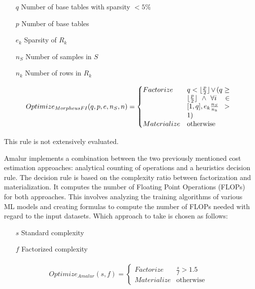 \begin{definition}
	\begin{itemize}
		\item[]
			\item[$q$]Number of base tables with sparsity $ < 5\% $
		\item[$p$] Number of base tables
		\item[$e_k$] Sparsity of $R_k$
		\item[$n_S$] Number of samples in $S$
		\item[$n_k$] Number of rows in $R_k$
	\end{itemize}

	\begin{align*}
		\begin{split}
			Optimize_{MorpheusFI}(q, p, e, n_S, n) =
			\begin{cases}
				Factorize   & \parbox[t]{.18\linewidth}{$q < \lfloor \frac{p}{2} \rfloor \vee ( q \geq \lfloor \frac{p}{2} \rfloor \wedge \forall i \in [1,q], e_k \frac{n_S}{n_k} > 1)$} \\
				Materialize & \text{otherwise}
			\end{cases}
		\end{split}
	\end{align*}
\end{definition}

This rule is not extensively evaluated.

Amalur \cite{schijndel_cost_estimation} implements a combination between the two previously mentioned cost estimation approaches: analytical counting of operations and a heuristics decision rule. The decision rule is based on the complexity ratio between factorization and materialization. It computes the number of Floating Point Operations (FLOPs) for both approaches. This involves analyzing the training algorithms of various ML models and creating formulas to compute the number of FLOPs needed with regard to the input datasets. Which approach to take is chosen as follows:

\begin{definition}

	\begin{itemize}
		\item[]
		\item[$s$] Standard complexity
		\item[$f$] Factorized complexity
	\end{itemize}

	\begin{align*}
		\begin{split}
			Optimize_{Amalur}(s, f) =
			\begin{cases}
				Factorize   & \frac{s}{f} > 1.5 \\
				Materialize & \text{otherwise}
			\end{cases}
		\end{split}
	\end{align*}
\end{definition}

